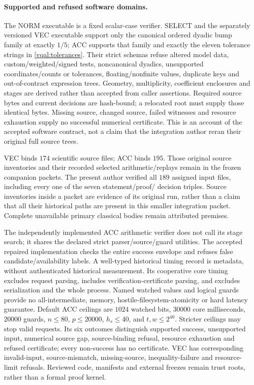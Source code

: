 \documentclass[11pt]{article}
\theoremstyle{plain}
\theoremstyle{definition}
\theoremstyle{remark}
\begin{document}
\paragraph{Supported and refused software domains.}
The NORM executable is a fixed scalar-case verifier. SELECT and the
separately versioned VEC executable support only the canonical ordered
dyadic bump family at exactly $1/5$; ACC supports that family and exactly
the eleven tolerance strings in \eqref{vqal:tolerances}. Their strict
schemas refuse altered model data, custom/weighted/signed tests,
noncanonical dyadics, unsupported coordinates/counts or tolerances,
floating/nonfinite values, duplicate keys and out-of-contract expression
trees. Geometry, multiplicity, coefficient enclosures and stages are
derived rather than accepted from caller assertions. Required source
bytes and current decisions are hash-bound; a relocated root must supply
those identical bytes. Missing source, changed source, failed witnesses
and resource exhaustion supply no successful numerical certificate.
This is an account of the accepted software contract, not a claim that
the integration author reran their original full source trees.

VEC binds $174$ scientific source files; ACC binds $195$. Those original
source inventories and their recorded selected arithmetic/replays remain
in the frozen companion packets. The present author verified all $189$
assigned input files, including every one of the seven statement/proof/
decision triples. Source inventories inside a packet are evidence of its
original run, rather than a claim that all their historical paths are
present in this smaller integration packet. Complete unavailable primary
classical bodies remain attributed premises.

The independently implemented ACC arithmetic verifier does not call its
stage search; it shares the declared strict parser/source/guard utilities.
The accepted repaired implementation checks the entire success envelope
and refuses false candidate/availability labels. A well-typed historical
timing record is metadata, without authenticated historical measurement.
Its cooperative core timing excludes request parsing, includes
verification-certificate parsing, and excludes serialization and the
whole process. Named watched values and logical guards provide no
all-intermediate, memory, hostile-filesystem-atomicity or hard latency
guarantee. Default ACC ceilings are $1024$ watched bits, $30000$ core
milliseconds, $20000$ guards, $n\le80$, $p\le20000$, $h_s\le40$,
and $t,w\le2^{40}$. Stricter ceilings may stop valid requests.
Its six outcomes distinguish supported success, unsupported input,
numerical source gap, source-binding refusal, resource exhaustion and
refused certificate; every non-success has no certificate. VEC has
corresponding invalid-input, source-mismatch, missing-source,
inequality-failure and resource-limit refusals. Reviewed code, manifests
and external freezes remain trust roots, rather than a formal proof kernel.
\end{document}
